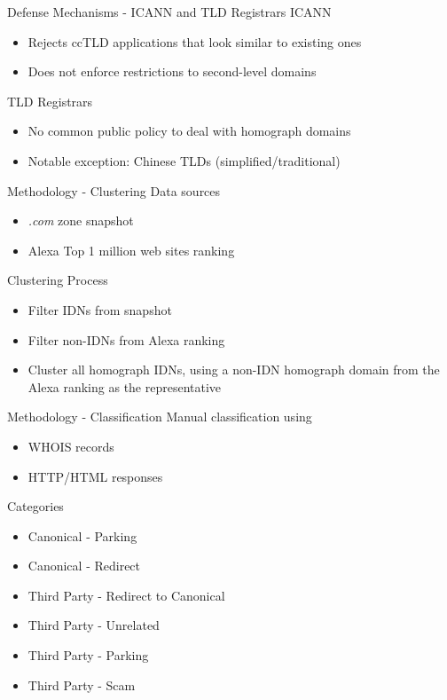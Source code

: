 \documentclass[usepdftitle=false]{beamer}
\begin{document}
\begin{frame}{Defense Mechanisms - ICANN and TLD Registrars}
ICANN
\begin{itemize}
  \item Rejects ccTLD applications that look similar to existing ones
  \item Does not enforce restrictions to second-level domains
\end{itemize}
TLD Registrars
\begin{itemize}
  \item No common public policy to deal with homograph domains
  \item Notable exception: Chinese TLDs (simplified/traditional)
\end{itemize}
\end{frame}

\begin{frame}{Methodology - Clustering}
Data sources
\begin{itemize}
  \item \textit{.com} zone snapshot
  \item Alexa Top 1 million web sites ranking
\end{itemize}
Clustering Process
\begin{itemize}
  \item Filter IDNs from snapshot
  \item Filter non-IDNs from Alexa ranking
  \item Cluster all homograph IDNs, using a non-IDN homograph domain from the Alexa ranking as the representative
\end{itemize}
\end{frame}

\begin{frame}{Methodology - Classification}
Manual classification using
\begin{itemize}
  \item WHOIS records
  \item HTTP/HTML responses
\end{itemize}
Categories
\begin{itemize}
  \item Canonical - Parking
  \item Canonical - Redirect
  \item Third Party - Redirect to Canonical
  \item Third Party - Unrelated
  \item Third Party - Parking
  \item Third Party - Scam
\end{itemize}
\end{frame}
\end{document}
